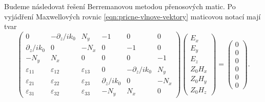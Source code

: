 Budeme následovat řešení Berremanovou metodou přenosových matic\cite{berremanOpticsStratifiedAnisotropic1972}.
Po vyjádření Maxwellových rovnic \eqref{eqn:pricne-vlnove-vektory} maticovou notací mají tvar
\begin{equation}
\label{eqn:Berreman-6x6}
    \begin{pmatrix}
        0 & -\partial_z/ik_0 & N_y & -1 & 0 & 0 \\
        \partial_z/ik_0 & 0 & -N_x & 0 & -1 & 0 \\
        -N_y & N_x & 0 & 0 & 0 & -1 \\
        \varepsilon_{11} & \varepsilon_{12} & \varepsilon_{13} & 0 & -\partial_z/ik_0 & N_y \\
        \varepsilon_{21} & \varepsilon_{22} & \varepsilon_{23} & \partial_z/ik_0 & 0 & -N_x \\
        \varepsilon_{31} & \varepsilon_{32} & \varepsilon_{33} & -N_y & N_x & 0
    \end{pmatrix}
    \begin{pmatrix}
        E_x \\ E_y \\ E_z \\ Z_0 H_x \\ Z_0 H_y \\ Z_0 H_z
    \end{pmatrix} = \begin{pmatrix} 0 \\ 0 \\ 0 \\ 0 \\ 0 \\ 0 \end{pmatrix} .
\end{equation}

